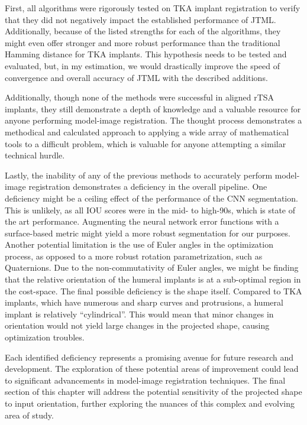 First, all algorithms were rigorously tested on TKA implant registration to verify that they did not negatively impact the established performance of JTML.
Additionally, because of the listed strengths for each of the algorithms, they might even offer stronger and more robust performance than the traditional Hamming distance for TKA implants.
This hypothesis needs to be tested and evaluated, but, in my estimation, we would drastically improve the speed of convergence and overall accuracy of JTML with the described additions.

Additionally, though none of the methods were successful in aligned rTSA implants, they still demonstrate a depth of knowledge and a valuable resource for anyone performing model-image registration.
The thought process demonstrates a methodical and calculated approach to applying a wide array of mathematical tools to a difficult problem, which is valuable for anyone attempting a similar technical hurdle.

Lastly, the inability of any of the previous methods to accurately perform model-image registration demonstrates a deficiency in the overall pipeline.
One deficiency might be a ceiling effect of the performance of the CNN segmentation.
This is unlikely, as all IOU scores were in the mid- to high-90s, which is state of the art performance.
Augmenting the neural network error functions with a surface-based metric might yield a more robust segmentation for our purposes.
Another potential limitation is the use of Euler angles in the optimization process, as opposed to a more robust rotation parametrization, such as Quaternions.
Due to the non-commutativity of Euler angles, we might be finding that the relative orientation of the humeral implants is at a sub-optimal region in the cost-space.
The final possible deficiency is the shape itself.
Compared to TKA implants, which have numerous and sharp curves and protrusions, a humeral implant is relatively ``cylindrical''.
This would mean that minor changes in orientation would not yield large changes in the projected shape, causing optimization troubles.

Each identified deficiency represents a promising avenue for future research and development.
The exploration of these potential areas of improvement could lead to significant advancements in model-image registration techniques.
The final section of this chapter will address the potential sensitivity of the projected shape to input orientation, further exploring the nuances of this complex and evolving area of study.


